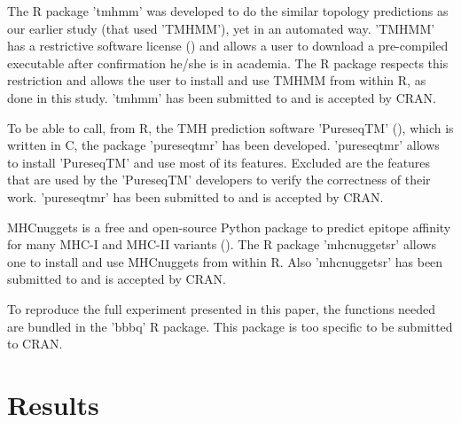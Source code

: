 
The R package 'tmhmm' was developed to do the similar topology
predictions as our earlier study (that used 'TMHMM'), yet in an automated way.
'TMHMM' has a restrictive software license (\cite{krogh2001predicting}) and allows a user
to download a pre-compiled executable after confirmation he/she
is in academia. The R package respects this restriction
and allows the user to install and use TMHMM from within R,
as done in this study.
'tmhmm' has been submitted to and is accepted by CRAN.


To be able to call, from R, the TMH prediction 
software 'PureseqTM' (\cite{wang2019efficient}),
which is written in C, the package 'pureseqtmr' has been developed. 
'pureseqtmr' allows to install 'PureseqTM' and use most of its features.
Excluded are the features that are used by the 'PureseqTM' 
developers to verify the correctness of their work.
'pureseqtmr' has been submitted to and is accepted by CRAN.


MHCnuggets is a free and open-source Python package to predict 
epitope affinity for many MHC-I and MHC-II variants (\cite{shao2020high}).
The R package 'mhcnuggetsr' allows one to install and use MHCnuggets
from within R.
Also 'mhcnuggetsr' has been submitted to and is accepted by CRAN.


To reproduce the full experiment presented in this paper,
the functions needed are bundled in the 'bbbq' R package.
This package is too specific to be submitted to CRAN.

\section{Results}

